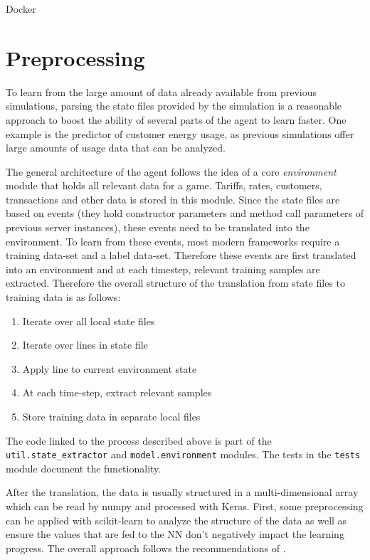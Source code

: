 Docker 

\section{Preprocessing}

To learn from the large amount of data already available from previous simulations, parsing the state files provided by
the simulation is a reasonable approach to boost the ability of several parts of the agent to learn faster. One example
is the predictor of customer energy usage, as previous simulations offer large amounts of usage data that can be
analyzed.

The general architecture of the agent follows the idea of a core \emph{environment} module that holds all relevant data
for a game. Tariffs, rates, customers, transactions and other data is stored in this module. Since the state files are
based on events (they hold constructor parameters and method call parameters of previous server instances), these events
need to be translated into the environment. To learn from these events, most modern frameworks require a training
data-set and a label data-set. Therefore these events are first translated into an environment and at each timestep,
relevant training samples are extracted. Therefore the overall structure of the translation from state files to training
data is as follows:

\begin{enumerate} \item Iterate over all local state files \item Iterate over lines in state file \item Apply line to
current environment state \item At each time-step, extract relevant samples \item Store training data in separate local
files \end{enumerate}

The code linked to the process described above is part of the \texttt{util.state\_extractor} and
\texttt{model.environment} modules. The tests in the \texttt{tests} module document the functionality.

After the translation, the data is usually structured in a multi-dimensional array which can be read by numpy and
processed with Keras. First, some preprocessing can be applied with scikit-learn to analyze the structure of the data as
well as ensure the values that are fed to the \ac {NN} don't negatively impact the learning progress. The overall
approach follows the recommendations of \citep{Goodfellow-et-al-2016}.  


